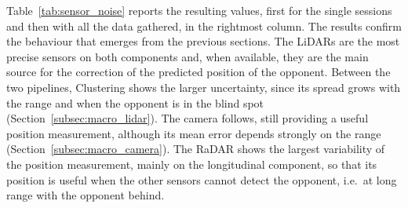 Table~\ref{tab:sensor_noise} reports the resulting values, first for the single sessions
and then with all the data gathered, in the rightmost column. The results confirm the behaviour that emerges from the
previous sections. The LiDARs are the most precise sensors on both components and, when
available, they are the main source for the correction of the predicted position of the
opponent. Between the two pipelines, Clustering shows the larger uncertainty, since its
spread grows with the range and when the opponent is in the blind spot
(Section~\ref{subsec:macro_lidar}). The camera follows, still providing a useful position
measurement, although its mean error depends strongly on the range
(Section~\ref{subsec:macro_camera}). The RaDAR shows the largest variability of the
position measurement, mainly on the longitudinal component, so that its position is useful
when the other sensors cannot detect the opponent, i.e.\ at long range with the opponent
behind.
\begin{table}[H]
\centering
\small
\setlength{\tabcolsep}{3.5pt}
\caption{Standard deviation [m] of the residual errors, per session and with all the
sessions gathered.}
\label{tab:sensor_noise}
\end{table}
